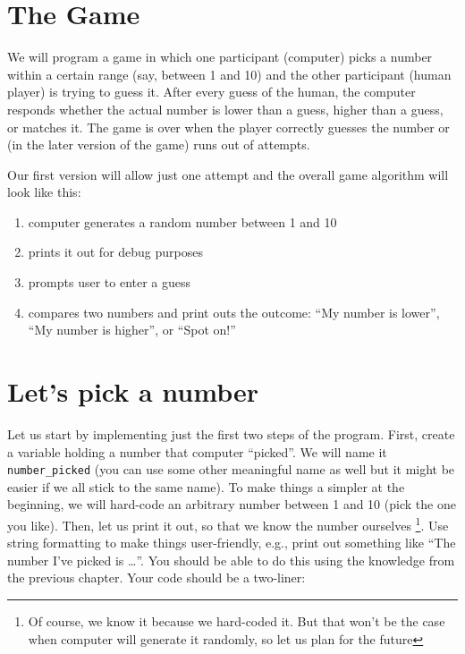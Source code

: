 \documentclass[
]{book}
\providecommand{\tightlist}{%
  \setlength{\itemsep}{0pt}\setlength{\parskip}{0pt}}
\begin{document}
\hypertarget{the-game}{%
\section{The Game}\label{the-game}}

We will program a game in which one participant (computer) picks a number within a certain range (say, between 1 and 10) and the other participant (human player) is trying to guess it. After every guess of the human, the computer responds whether the actual number is lower than a guess, higher than a guess, or matches it. The game is over when the player correctly guesses the number or (in the later version of the game) runs out of attempts.

Our first version will allow just one attempt and the overall game algorithm will look like this:

\begin{enumerate}
\def\labelenumi{\arabic{enumi}.}
\tightlist
\item
  computer generates a random number between 1 and 10
\item
  prints it out for debug purposes
\item
  prompts user to enter a guess
\item
  compares two numbers and print outs the outcome: ``My number is lower'', ``My number is higher'', or ``Spot on!''
\end{enumerate}

\hypertarget{lets-pick-a-number}{%
\section{Let's pick a number}\label{lets-pick-a-number}}

Let us start by implementing just the first two steps of the program. First, create a variable holding a number that computer ``picked''. We will name it \texttt{number\_picked} (you can use some other meaningful name as well but it might be easier if we all stick to the same name). To make things a simpler at the beginning, we will hard-code an arbitrary number between 1 and 10 (pick the one you like). Then, let us print it out, so that we know the number ourselves \footnote{Of course, we know it because we hard-coded it. But that won't be the case when computer will generate it randomly, so let us plan for the future}. Use string formatting to make things user-friendly, e.g., print out something like ``The number I've picked is \ldots{}''. You should be able to do this using the knowledge from the previous chapter. Your code should be a two-liner:
\end{document}
